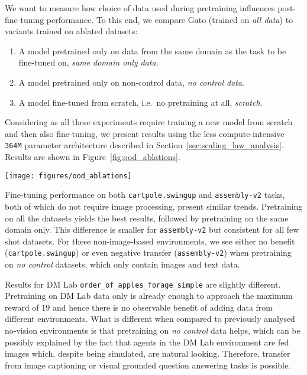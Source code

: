 \documentclass[10pt]{article} \usepackage[accepted]{tmlr}
\newcommand{\model}{{Gato}}
\newcommand{\dmlab}{{DM Lab}}
\begin{document}
We want to measure how choice of data used during pretraining influences post-fine-tuning performance.
To this end, we compare \model{} (trained on \textit{all data}) to variants trained on ablated datasets:
\begin{enumerate}
\item A model pretrained only on data from the same domain as the task to be fine-tuned on, \textit{same domain only data}.
\item A model pretrained only on non-control data, \textit{no control data}.
\item A model fine-tuned from scratch, i.e.\ no pretraining at all, \textit{scratch}.
\end{enumerate}

Considering as all these experiments require training a new model from scratch and then also fine-tuning, we present results using the less compute-intensive \texttt{364M} parameter architecture described in Section~\ref{sec:scaling_law_analysis}.
Results are shown in Figure~\ref{fig:ood_ablations}.
\begin{figure*}[t]
    \texttt{[image: figures/ood\_ablations]}    
    \caption{
    {\bf Few-shot performance, ablating over various pretraining settings.} Orange corresponds to the base \model{} pretrained on all data. Red is trained from scratch only on the few-shot data. \texttt{364M} parameter variants of \model{} were used for this experiment to save compute.
    \label{fig:ood_ablations}}
\end{figure*}


Fine-tuning performance on both \texttt{cartpole.swingup} and \texttt{assembly-v2} tasks, both of which do not require image processing, present similar trends.
Pretraining on all the datasets yields the best results, followed by pretraining on the same domain only. This difference is smaller for \texttt{assembly-v2} but consistent for all few shot datasets.
For these non-image-based environments, we see either no benefit (\texttt{cartpole.swingup}) or even negative transfer (\texttt{assembly-v2}) when pretraining on \textit{no control} datasets, which only contain images and text data.


Results for \dmlab{} \texttt{order\_of\_apples\_forage\_simple} are slightly different.
Pretraining on \dmlab{} data only is already enough to approach the maximum reward of 19 and hence there is no observable benefit of adding data from different environments.
What is different when compared to previously analysed no-vision environments is that pretraining on \textit{no control} data helps,
which can be possibly explained by the fact that agents in the \dmlab{} environment are fed images which, despite being simulated, are natural looking.
Therefore, transfer from image captioning or visual grounded question answering tasks is possible.
\end{document}
